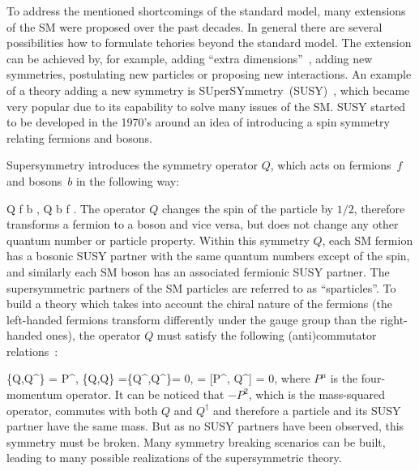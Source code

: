 To address the mentioned shortcomings of the standard model, many extensions of the SM were proposed over the past decades. In general there are several possibilities how to formulate tehories beyond the standard model. The extension can be achieved by, for example, adding ``extra dimensions''~\cite{Patrignani:2016xqp}, adding new symmetries, postulating new particles or proposing new interactions. An example of a theory adding a new symmetry is SUperSYmmetry~(SUSY)~\cite{Martin:1997ns}, which became very popular due to its capability to solve many issues of the SM. SUSY started to be developed in the 1970's around an idea of introducing a spin symmetry relating fermions and bosons.
  

Supersymmetry introduces the symmetry operator $Q$, which acts on fermions~$f$ and bosons~$b$ in the following way:

{
Q \mid f \rangle \to \mid b \rangle ,
}
{ 
Q \mid b \rangle \to \mid f \rangle .
}
The operator $Q$ changes the spin of the particle by $1/2$, therefore transforms a fermion to a boson and vice versa, but does not change any other quantum number or particle property. Within this symmetry $Q$, each SM fermion has a bosonic SUSY partner with the same quantum numbers except of the spin, and similarly each SM boson has an associated fermionic SUSY partner. The supersymmetric partners of the SM particles are referred to as ``sparticles''. To build a theory which takes into account the chiral nature of the fermions (the left-handed fermions transform differently under the gauge group than the right-handed ones), the operator $Q$ must satisfy the following (anti)commutator relations~\cite{Haag:1974qh, Coleman:1967ad}:

{
\{Q,Q^{\dagger}\} = P^{\mu}, \; \{Q,Q\} =\{Q^{\dagger},Q^{\dagger}\}= 0, \; [P^{\mu}, Q] = [P^{\mu}, Q^{\dagger}] = 0,
}
where $P^{\mu}$ is the four-momentum operator. It can be noticed that $-P^{2}$, which is the mass-squared operator, commutes with both $Q$ and $Q^{\dagger}$ and therefore a particle and its SUSY partner have the same mass. But as no SUSY partners have been observed, this symmetry must be broken. Many symmetry breaking scenarios can be built, leading to many possible realizations of the supersymmetric theory. 

